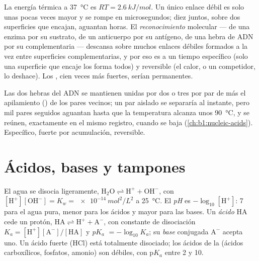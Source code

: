 \begin{proposition}\label{prop:b1:water-small-molecules:weak}
La energía térmica a \qty{37}{\celsius} es $RT = \qty{2.6}{kJ/mol}$. Un
único enlace débil es solo unas pocas veces mayor y se rompe en
microsegundos; diez juntos, sobre dos superficies que encajan, aguantan
horas. El \emph{reconocimiento} molecular
--- de una enzima por su sustrato, de un anticuerpo por su antígeno, de una
hebra de ADN por su complementaria --- descansa sobre muchos enlaces débiles
formados a la vez entre superficies complementarias, y por eso es a un
tiempo específico (solo una superficie que encaje los forma todos) y
reversible (el calor, o un competidor, lo deshace). Los ,
cien veces más fuertes, serían permanentes.
\end{proposition}

\begin{example}\label{ex:b1:water-small-molecules:melting}
Las dos hebras del ADN se mantienen unidas por dos o tres  por par de  más el apilamiento () de los pares
vecinos; un par aislado se separaría al instante, pero mil pares seguidos
aguantan hasta que la temperatura alcanza unos \qty{90}{\celsius}, y se
reúnen, exactamente en el mismo registro, cuando se baja
(\cref{ch:b1:nucleic-acids}). Específico, fuerte por acumulación,
reversible.
\end{example}

\section{Ácidos, bases y tampones}

\begin{definition}\label{def:b1:water-small-molecules:ph}
El agua se disocia ligeramente, $\mathrm{H_2O} \rightleftharpoons
\mathrm{H^+} + \mathrm{OH^-}$, con $[\mathrm{H^+}][\mathrm{OH^-}] =
K_w = \qty{e-14}{mol^2/L^2}$ a \qty{25}{\celsius}. El \emph{pH}
es $-\log_{10}[\mathrm{H^+}]$: 7 para el agua pura, menor para los ácidos y
mayor para las bases. Un \emph{ácido} $\mathrm{HA}$ cede un
protón, $\mathrm{HA} \rightleftharpoons \mathrm{H^+} +
\mathrm{A^-}$, con
constante de disociación $K_a =
[\mathrm{H^+}][\mathrm{A^-}]/[\mathrm{HA}]$ y
\emph{p$K_a$} $= -\log_{10}K_a$; su \emph{base}
conjugada $\mathrm{A^-}$ acepta uno. Un ácido fuerte (HCl) está totalmente
disociado; los ácidos de la  (ácidos carboxílicos, fosfatos, amonio)
son débiles, con p$K_a$ entre 2 y 10.
\end{definition}

